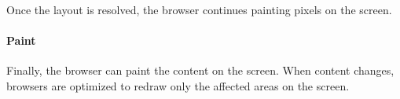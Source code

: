 Once the layout is resolved, the browser continues painting pixels on the screen.







\paragraph{Paint} %

Finally, the browser can paint the content on the screen.
When content changes, browsers are optimized to redraw only the affected areas on the screen. %













